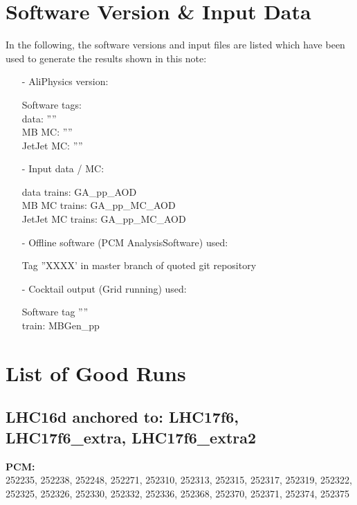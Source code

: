\section{Software Version \& Input Data}
\label{sec:software}
In the following, the software versions and input files are listed which have been used to generate the results shown in this note:

\begin{enumerate}
\item[-] AliPhysics \cite{AliPhysicsPCM2015} version:
\begin{center}
Software tags:\\
data: ''''\\
MB MC:  ''''\\
JetJet MC: ''''
\end{center}

\item[-] Input data / MC:
\begin{center}
data trains: GA\_pp\_AOD  \\
MB MC trains: GA\_pp\_MC\_AOD \\
JetJet MC trains: GA\_pp\_MC\_AOD
\end{center}

\item[-] Offline software (PCM AnalysisSoftware) \cite{ConvSoftware} used:
\begin{center}
Tag ''XXXX' in master branch of quoted git repository
\end{center}

\item[-] Cocktail output (Grid running) \cite{ConvSoftware} used:
\begin{center}
Software tag ''''\\
train: MBGen\_pp
\end{center}

\end{enumerate}

\section{List of Good Runs}
\label{sec:goodRuns}


 \subsection{LHC16d anchored to: LHC17f6, LHC17f6\_extra, LHC17f6\_extra2}

 \textbf{PCM:}\\
252235, 252238, 252248, 252271, 252310, 252313, 252315, 252317, 252319, 252322, 252325, 252326, 252330, 252332, 252336, 252368, 252370, 252371, 252374, 252375\\

